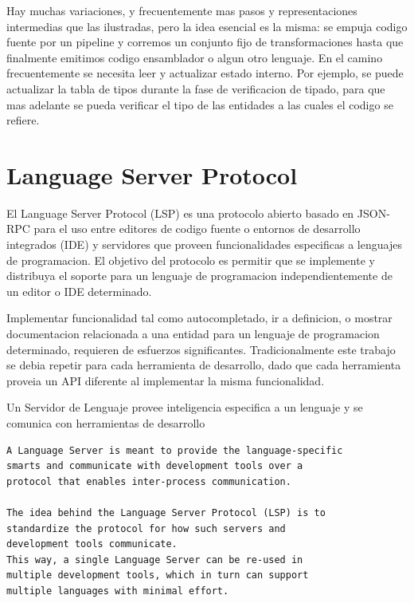 \documentclass[12pt, a4paper]{report}
\begin{document}
Hay muchas variaciones, y frecuentemente mas pasos y representaciones
intermedias que las ilustradas, pero la idea esencial es la misma: se empuja
codigo fuente por un pipeline y corremos un conjunto fijo de transformaciones
hasta que finalmente emitimos codigo ensamblador o algun otro lenguaje. En el
camino frecuentemente se necesita leer y actualizar estado interno. Por ejemplo,
se puede actualizar la tabla de tipos durante la fase de verificacion de tipado,
para que mas adelante se pueda verificar el tipo de las entidades a las cuales
el codigo se refiere. \cite{olle_query_based}

\section*{Language Server Protocol}

El Language Server Protocol (LSP) es una protocolo abierto basado en JSON-RPC
para el uso entre editores de codigo fuente o entornos de desarrollo integrados
(IDE) y servidores que proveen funcionalidades especificas a lenguajes de
programacion. El objetivo del protocolo es permitir que se implemente y
distribuya el soporte para un lenguaje de programacion independientemente de un
editor o IDE determinado.
\cite{language_server_protocol}

Implementar funcionalidad tal como autocompletado, ir a definicion, o mostrar
documentacion relacionada a una entidad para un lenguaje de programacion
determinado, requieren de esfuerzos significantes. Tradicionalmente este trabajo
se debia repetir para cada herramienta de desarrollo, dado que cada herramienta
proveia un API diferente al implementar la misma funcionalidad.
\cite{language_server_protocol}

Un Servidor de Lenguaje provee inteligencia especifica a un lenguaje y se
comunica con herramientas de desarrollo
\cite{language_server_protocol}

\begin{verbatim}
A Language Server is meant to provide the language-specific
smarts and communicate with development tools over a
protocol that enables inter-process communication.

The idea behind the Language Server Protocol (LSP) is to
standardize the protocol for how such servers and
development tools communicate.
This way, a single Language Server can be re-used in
multiple development tools, which in turn can support
multiple languages with minimal effort.
\end{verbatim}
\cite{language_server_protocol}
\end{document}
